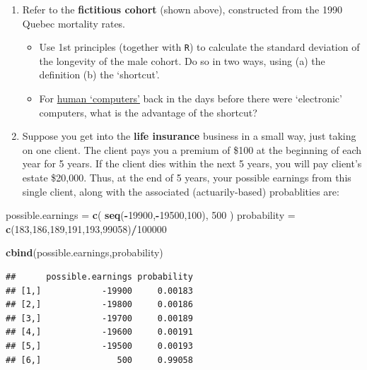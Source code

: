 \documentclass[]{book}
\newenvironment{Shaded}{\begin{snugshade}}{\end{snugshade}}
\newcommand{\DecValTok}[1]{\textcolor[rgb]{0.00,0.00,0.81}{#1}}
\newcommand{\KeywordTok}[1]{\textcolor[rgb]{0.13,0.29,0.53}{\textbf{#1}}}
\newcommand{\NormalTok}[1]{#1}
\newcommand{\OperatorTok}[1]{\textcolor[rgb]{0.81,0.36,0.00}{\textbf{#1}}}
\newcommand{\StringTok}[1]{\textcolor[rgb]{0.31,0.60,0.02}{#1}}
\providecommand{\tightlist}{%
  \setlength{\itemsep}{0pt}\setlength{\parskip}{0pt}}
\begin{document}
\begin{enumerate}
\def\labelenumi{\arabic{enumi}.}
\item
  Refer to the \textbf{fictitious cohort} (shown above), constructed from the 1990 Quebec mortality rates.

  \begin{itemize}
  \tightlist
  \item
    Use 1st principles (together with \texttt{R}) to calculate the standard deviation of the longevity of the male cohort. Do so in two ways, using (a) the definition (b) the `shortcut'.
  \item
    For \href{http://www.medicine.mcgill.ca/epidemiology/hanley/Reprints/Hanley_Article_Galton_Data.pdf\#page=7}{human `computers'} back in the days before there were `electronic' computers, what is the advantage of the shortcut?
  \end{itemize}
\item
  Suppose you get into the \textbf{life insurance} business in a small way, just taking on one client. The client pays you a premium of \$100 at the beginning of each year for 5 years. If the client dies within the next 5 years, you will pay client's estate \$20,000. Thus, at the end of 5 years, your possible earnings from this single client, along with the associated (actuarily-based) probablities are:
\end{enumerate}

\begin{Shaded}
\begin{Highlighting}[]
\NormalTok{possible.earnings =}\StringTok{ }\KeywordTok{c}\NormalTok{( }\KeywordTok{seq}\NormalTok{(}\OperatorTok{-}\DecValTok{19900}\NormalTok{,}\OperatorTok{-}\DecValTok{19500}\NormalTok{,}\DecValTok{100}\NormalTok{), }\DecValTok{500}\NormalTok{ ) }
\NormalTok{probability =}\StringTok{ }\KeywordTok{c}\NormalTok{(}\DecValTok{183}\NormalTok{,}\DecValTok{186}\NormalTok{,}\DecValTok{189}\NormalTok{,}\DecValTok{191}\NormalTok{,}\DecValTok{193}\NormalTok{,}\DecValTok{99058}\NormalTok{)}\OperatorTok{/}\DecValTok{100000} 

\KeywordTok{cbind}\NormalTok{(possible.earnings,probability)}
\end{Highlighting}
\end{Shaded}

\begin{verbatim}
##      possible.earnings probability
## [1,]            -19900     0.00183
## [2,]            -19800     0.00186
## [3,]            -19700     0.00189
## [4,]            -19600     0.00191
## [5,]            -19500     0.00193
## [6,]               500     0.99058
\end{verbatim}
\end{document}
